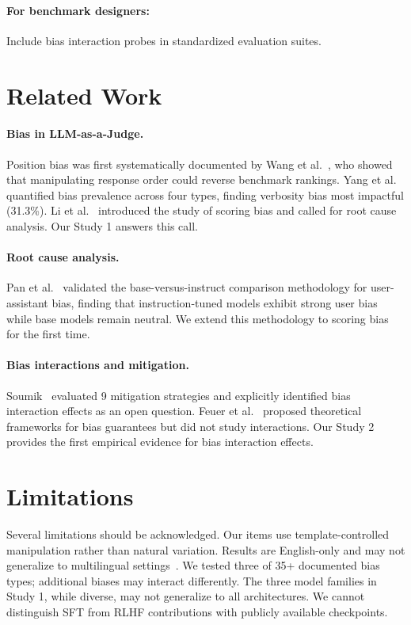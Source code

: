 \documentclass[11pt,twocolumn]{article}
\begin{document}
\paragraph{For benchmark designers:} Include bias interaction probes in standardized evaluation suites.

\section{Related Work}

\paragraph{Bias in LLM-as-a-Judge.} Position bias was first systematically documented by Wang et al.~\cite{wang2023large}, who showed that manipulating response order could reverse benchmark rankings. Yang et al.~\cite{yang2025reliable} quantified bias prevalence across four types, finding verbosity bias most impactful (31.3\%). Li et al.~\cite{li2025scoring} introduced the study of scoring bias and called for root cause analysis. Our Study 1 answers this call.

\paragraph{Root cause analysis.} Pan et al.~\cite{pan2025user} validated the base-versus-instruct comparison methodology for user-assistant bias, finding that instruction-tuned models exhibit strong user bias while base models remain neutral. We extend this methodology to scoring bias for the first time.

\paragraph{Bias interactions and mitigation.} Soumik~\cite{soumik2026judging} evaluated 9 mitigation strategies and explicitly identified bias interaction effects as an open question. Feuer et al.~\cite{feuer2026provably} proposed theoretical frameworks for bias guarantees but did not study interactions. Our Study 2 provides the first empirical evidence for bias interaction effects.

\section{Limitations}

Several limitations should be acknowledged. Our items use template-controlled manipulation rather than natural variation. Results are English-only and may not generalize to multilingual settings~\cite{dogruoz2026multilingual}. We tested three of 35+ documented bias types; additional biases may interact differently. The three model families in Study 1, while diverse, may not generalize to all architectures. We cannot distinguish SFT from RLHF contributions with publicly available checkpoints.
\end{document}
